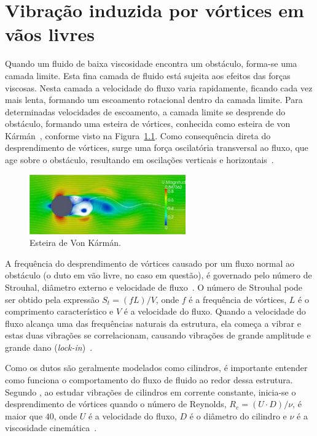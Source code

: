 \chapter{Vibração induzida por vórtices em vãos livres}

Quando um fluido de baixa viscosidade encontra um obstáculo, forma-se uma camada limite.
Esta fina camada de fluido está sujeita aos efeitos das forças viscosas.
Nesta camada a velocidade do fluxo varia rapidamente, ficando cada vez mais lenta, formando um escoamento rotacional dentro da camada limite.
Para determinadas velocidades de escoamento, a camada limite se desprende do obstáculo, formando uma esteira de vórtices, conhecida como esteira de von Kármán~\cite{Currie2002}, conforme visto na Figura~\ref{fig:viv_shading}.
Como consequência direta do desprendimento de vórtices, surge uma força oscilatória transversal ao fluxo, que age sobre o obstáculo, resultando em oscilações verticais e horizontais~\cite{Nielsen2002}.

\begin{figure}[!ht]
    \centering
    \caption{Esteira de Von Kármán.}\label{fig:viv_shading}
    \includegraphics[width=0.6\textwidth]{imagens/viv_shading}
\end{figure}

A frequência do desprendimento de vórtices causado por um fluxo normal ao obstáculo (o duto em vão livre, no caso em questão), é governado pelo número de Strouhal, diâmetro externo e velocidade de fluxo~\cite{Mork2003}.
O número de Strouhal pode ser obtido pela expressão $S_t = (f L) / V$, onde $f$ é a frequência de vórtices, $L$ é o comprimento característico e $V$ é a velocidade do fluxo.
Quando a velocidade do fluxo alcança uma das frequências naturais da estrutura, ela começa a vibrar e estas duas vibrações se correlacionam, causando vibrações de grande amplitude e grande dano (\textit{lock-in})~\cite{Mork2003}.

Como os dutos são geralmente modelados como cilindros, é importante entender como funciona o comportamento do fluxo de fluido ao redor dessa estrutura. Segundo , ao estudar vibrações de cilindros em corrente constante, inicia-se o desprendimento de vórtices quando o número de Reynolds, $R_e = (U\cdot D)/\nu$, é maior que $40$, onde $U$ é a velocidade do fluxo, $D$ é o diâmetro do cilindro e $\nu$ é a viscosidade cinemática~\cite{Sumer1995}.

